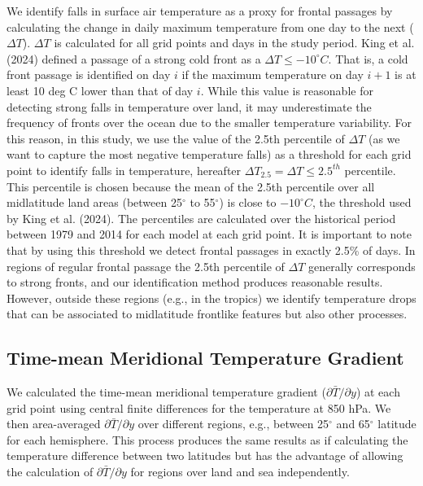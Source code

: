 \documentclass[
]{agujournal2019}
\begin{document}
We identify falls in surface air temperature as a proxy for frontal
passages by calculating the change in daily maximum temperature from one
day to the next (\(\Delta T\)). \(\Delta T\) is calculated for all grid
points and days in the study period. King et al. (2024) defined a
passage of a strong cold front as a \(\Delta T \le -10^{\circ}C\). That
is, a cold front passage is identified on day \(i\) if the maximum
temperature on day \(i+1\) is at least 10 deg C lower than that of day
\(i\). While this value is reasonable for detecting strong falls in
temperature over land, it may underestimate the frequency of fronts over
the ocean due to the smaller temperature variability. For this reason,
in this study, we use the value of the 2.5th percentile of \(\Delta T\)
(as we want to capture the most negative temperature falls) as a
threshold for each grid point to identify falls in temperature,
hereafter \(\Delta T_{2.5} = \Delta T \le 2.5^{th}\) percentile. This
percentile is chosen because the mean of the 2.5th percentile over all
midlatitude land areas (between 25\(^{\circ}\) to 55\(^{\circ}\)) is
close to \(-10^{\circ}C\), the threshold used by King et al. (2024). The
percentiles are calculated over the historical period between 1979 and
2014 for each model at each grid point. It is important to note that by
using this threshold we detect frontal passages in exactly 2.5\% of
days. In regions of regular frontal passage the 2.5th percentile of
\(\Delta T\) generally corresponds to strong fronts, and our
identification method produces reasonable results. However, outside
these regions (e.g., in the tropics) we identify temperature drops that
can be associated to midlatitude frontlike features but also other
processes.

\subsection{Time-mean Meridional Temperature
Gradient}\label{time-mean-meridional-temperature-gradient}

We calculated the time-mean meridional temperature gradient
(\(\partial \bar{T}/ \partial y\)) at each grid point using central
finite differences for the temperature at 850 hPa. We then area-averaged
\(\partial \bar{T}/ \partial y\) over different regions, e.g., between
25\(^{\circ}\) and 65\(^{\circ}\) latitude for each hemisphere. This
process produces the same results as if calculating the temperature
difference between two latitudes but has the advantage of allowing the
calculation of \(\partial \bar{T}/ \partial y\) for regions over land
and sea independently.
\end{document}
